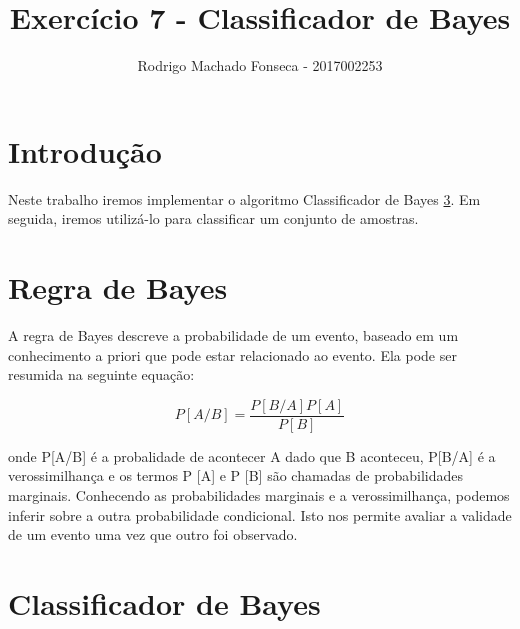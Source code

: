 \documentclass[12pt]{article}
\begin{document}

\pagestyle{fancy}
\fancyhf{}
\renewcommand{\headrulewidth}{0.4pt}
\fancyfoot[C]{\thepage}
\renewcommand{\footrulewidth}{0.4pt}
\fancyfoot[C]{\thepage}
\title{\LARGE \bf
 Exercício 7 - Classificador de Bayes }
\author{ Rodrigo Machado Fonseca - 2017002253}
\thispagestyle{fancy}
\maketitle
\thispagestyle{fancy}

\section{Introdução}

   \par Neste trabalho iremos implementar o algoritmo Classificador de Bayes \ref{ClassificadorBayes}. Em seguida, iremos utilizá-lo para classificar um conjunto de amostras.
   
\section{Regra de Bayes}

  \label{regradebayes}
  \par A regra de Bayes descreve a probabilidade de um evento, baseado em um conhecimento a priori que pode estar relacionado ao evento. Ela pode ser resumida na seguinte equação: 
  
  \begin{equation}
  P[A/B] = \frac{P[B/A]P[A]}{P[B]}
  \end{equation}

  \par onde P[A/B] é a probalidade de acontecer A dado que B aconteceu, P[B/A] é a verossimilhança e os termos P [A] e P [B] são chamadas de probabilidades marginais. Conhecendo as probabilidades marginais e a verossimilhança, podemos inferir sobre a outra probabilidade condicional. Isto nos permite avaliar a validade de um evento uma vez que outro foi observado.
  
\section{Classificador de Bayes}
  \label{ClassificadorBayes}
  
\end{document}
